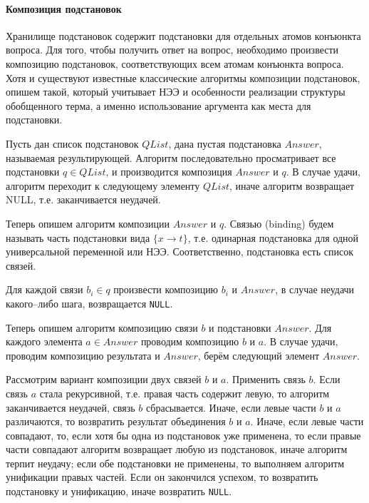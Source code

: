 \paragraph{Композиция подстановок}
Хранилище подстановок содержит подстановки для отдельных атомов конъюнкта вопроса. Для того, чтобы получить ответ на вопрос, необходимо произвести композицию подстановок, соответствующих всем атомам конъюнкта вопроса. Хотя и существуют известные классические алгоритмы композиции подстановок, опишем такой, который учитывает НЭЭ и особенности реализации структуры обобщенного терма, а именно использование аргумента как места для подстановки.

Пусть дан список подстановок $QList$, дана пустая подстановка $Answer$, называемая результирующей. Алгоритм последовательно просматривает все подстановки $q \in QList$, и производится композиция $Answer$ и $q$. В случае удачи, алгоритм переходит к следующему элементу $QList$, иначе алгоритм возвращает NULL, т.е. заканчивается неудачей.

Теперь опишем алгоритм композиции $Answer$ и $q$. Связью (binding) будем называть часть подстановки вида $\{x \rightarrow t\}$, т.е. одинарная подстановка для одной универсальной переменной или НЭЭ. Соответственно, подстановка есть список связей. %

Для каждой связи $b_i \in q$ произвести композицию $b_i$ и $Answer$, в случае неудачи какого--либо шага, возвращается \texttt{NULL}.

Теперь опишем алгоритм композицию связи $b$ и подстановки $Answer$. Для каждого элемента $a \in Answer$ проводим композицию $b$ и $a$. В случае удачи, проводим композицию результата и $Answer$, берём следующий элемент $Answer$.

Рассмотрим вариант композиции двух связей $b$ и $a$. Применить связь $b$. Если связь $a$ стала рекурсивной, т.е. правая часть содержит левую, то алгоритм заканчивается неудачей, связь $b$  сбрасывается. Иначе, если левые части $b$ и $a$ различаются, то возвратить результат объединения $b$ и $a$. Иначе, если левые части совпадают, то, если хотя бы одна из подстановок уже применена, то если правые части совпадают алгоритм возвращает любую из подстановок, иначе алгоритм терпит неудачу; если обе подстановки не применены, то выполняем алгоритм унификации правых частей. Если он закончился успехом, то возвратить подстановку и унификацию, иначе возвратить \texttt{NULL}.



